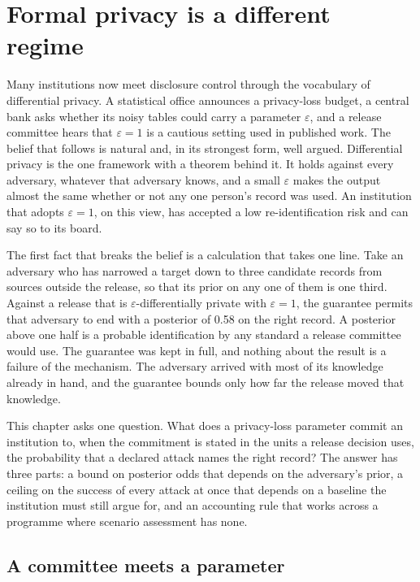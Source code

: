\chapter{Formal privacy is a different regime}\label{ch:dp}

Many institutions now meet disclosure control through the vocabulary of
differential privacy. A statistical office announces a privacy-loss budget, a
central bank asks whether its noisy tables could carry a parameter
$\varepsilon$, and a release committee hears that $\varepsilon = 1$ is a
cautious setting used in published work. The belief that follows is natural and,
in its strongest form, well argued. Differential privacy is the one framework
with a theorem behind it. It holds against every adversary, whatever that
adversary knows, and a small $\varepsilon$ makes the output almost the same
whether or not any one person's record was used. An institution that adopts
$\varepsilon = 1$, on this view, has accepted a low re-identification risk and
can say so to its board.

The first fact that breaks the belief is a calculation that takes one line. Take
an adversary who has narrowed a target down to three candidate records from
sources outside the release, so that its prior on any one of them is one third.
Against a release that is $\varepsilon$-differentially private with
$\varepsilon = 1$, the guarantee permits that adversary to end with a posterior
of 0.58 on the right record.
A posterior above one half is a probable identification by any standard a
release committee would use. The guarantee was kept in full, and nothing about
the result is a failure of the mechanism. The adversary arrived with most of its
knowledge already in hand, and the guarantee bounds only how far the release
moved that knowledge.

This chapter asks one question. What does a privacy-loss parameter commit an
institution to, when the commitment is stated in the units a release decision
uses, the probability that a declared attack names the right record? The answer
has three parts: a bound on posterior odds that depends on the adversary's prior,
a ceiling on the success of every attack at once that depends on a baseline the
institution must still argue for, and an accounting rule that works across a
programme where scenario assessment has none.

\section{A committee meets a parameter}

